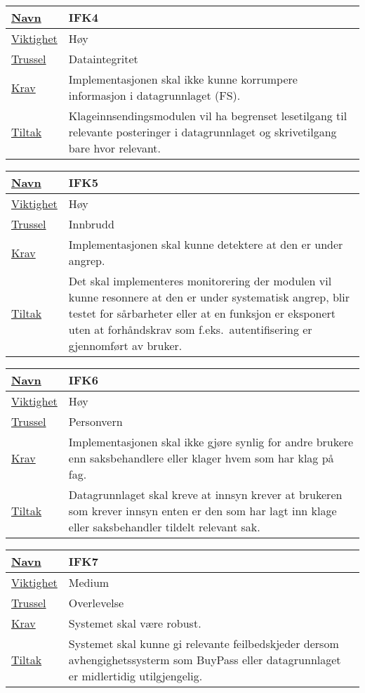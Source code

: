 \begin{tabularx}{\textwidth}{|l|X|}
  \hline
  \underline{Navn} & IFK4 \\ \hline
  \underline{Viktighet} & Høy \\ \hline
  \underline{Trussel} & Dataintegritet \\ \hline
  \underline{Krav} & Implementasjonen skal ikke kunne korrumpere informasjon i datagrunnlaget
  (FS). \\ \hline
  \underline{Tiltak} & Klageinnsendingsmodulen vil ha begrenset lesetilgang til relevante posteringer i datagrunnlaget og skrivetilgang bare hvor relevant. \\ \hline
\end{tabularx}

\vfill

\begin{tabularx}{\textwidth}{|l|X|}
  \hline
  \underline{Navn} & IFK5 \\ \hline
  \underline{Viktighet} & Høy \\ \hline
  \underline{Trussel} & Innbrudd \\ \hline
  \underline{Krav} & Implementasjonen skal kunne detektere at den er under angrep. \\ \hline
  \underline{Tiltak} & Det skal implementeres monitorering der modulen vil kunne resonnere at den er under systematisk angrep, blir testet for sårbarheter eller at en funksjon er
  eksponert uten at forhåndskrav som f.eks.\ autentifisering er gjennomført av bruker. \\ \hline
\end{tabularx}

\vfill

\begin{tabularx}{\textwidth}{|l|X|}
  \hline
  \underline{Navn} & IFK6 \\ \hline
  \underline{Viktighet} & Høy \\ \hline
  \underline{Trussel} & Personvern \\ \hline
  \underline{Krav} & Implementasjonen skal ikke gjøre synlig for andre brukere enn saksbehandlere eller klager hvem som har klag på fag. \\ \hline
  \underline{Tiltak} & Datagrunnlaget skal kreve at innsyn krever at brukeren som krever innsyn enten er den som har lagt inn klage eller saksbehandler tildelt relevant sak. \\ \hline
\end{tabularx}

\vfill

\begin{tabularx}{\textwidth}{|l|X|}
  \hline
  \underline{Navn} & IFK7 \\ \hline
  \underline{Viktighet} & Medium \\ \hline
  \underline{Trussel} & Overlevelse \\ \hline
  \underline{Krav} & Systemet skal være robust. \\ \hline
  \underline{Tiltak} & Systemet skal kunne gi relevante feilbedskjeder dersom
  avhengighetssysterm som BuyPass eller datagrunnlaget er midlertidig utilgjengelig. \\ \hline 
\end{tabularx}

